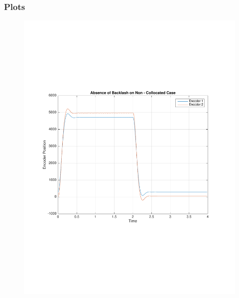 \documentclass[11pt, a4paper]{article}
\begin{document}
\subsubsection{Plots}
\begin{figure}[H]
\centering
\includegraphics[width = \textwidth]{12.pdf}
\end{figure}
\end{document}
